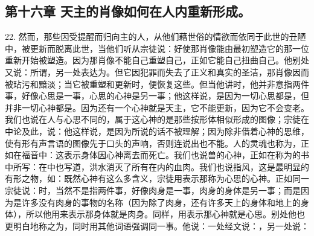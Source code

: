 
\subsection{第十六章 天主的肖像如何在人内重新形成。}

22. 然而，那些因受提醒而归向主的人，从他们藉世俗的情欲而依同于此世的丑陋中，被更新而脱离此世，当他们听从宗徒说：好使那肖像能由最初塑造它的那一位重新开始被塑造。因为那肖像不能自己重塑自己，正如它能自己扭曲自己。他别处又说：所谓，另一处表达为。但它因犯罪而失去了正义和真实的圣洁，那肖像因而被玷污和黯淡；当它被重塑和更新时，便恢复这些。但当他讲时，他并非意指两件事，好像心思是一事，心思的心神是另一事；他这样说，是因为一切心思都是，但并非一切心神都是。因为还有一个心神就是天主，它不能更新，因为它不会变老。我们也说在人与心思不同的，属于这心神的是那些按形体相似形成的图像；宗徒在中论及此，说：他这样说，是因为所说的话不被理解；因为除非借着心神的思维，使有形有声言语的图像先于口头的声响，否则连说出也不能。人的灵魂也称为，正如在福音中：这表示身体因心神离去而死亡。我们也说兽的心神，正如在称为的书中所写：在中也写道，洪水消灭了所有在内的血肉。我们也说指风，这是最明显的有形之物，如：既然心神有这么多含义，宗徒用表示那称为心思的心神。正如同一宗徒说：时，当然不是指两件事，好像肉身是一事，肉身的身体是另一事；而是因为是许多没有肉身的事物的名称（因为除了肉身，还有许多天上的身体和地上的身体），所以他用来表示那身体就是肉身。同样，用表示那心神就是心思。别处他也更明白地称之为，同时用其他词语强调同一事。他说：一处经文说：，另一处说：\par

